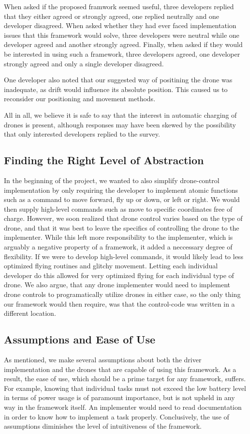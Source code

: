 When asked if the proposed framwork seemed useful, three developers replied that they either agreed or strongly agreed, one replied neutrally and one developer disagreed. When asked whether they had ever faced implementation issues that this framework would solve, three developers were neutral while one developer agreed and another strongly agreed. Finally, when asked if they would be interested in using such a framework, three developers agreed, one developer strongly agreed and only a single developer disagreed.

One developer also noted that our suggested way of positining the drone was inadequate, as drift would influence its absolute position. This caused us to reconsider our positioning and movement methods.

All in all, we believe it is safe to say that the interest in automatic charging of drones is present, although  responses may have been skewed by the possibility that only interested developers replied to the survey.

\subsection{Finding the Right Level of Abstraction}
In the beginning of the project, we wanted to also simplify drone-control implementation by only requiring the developer to implement atomic functions such as a command to move forward, fly up or down, or left or right. We would then supply high-level commands such as move to specific coordinates free of charge. However, we soon realized that drone control varies based on the type of drone, and that it was best to leave the specifics of controlling the drone to the implementer. While this left more responsibility to the implementer, which is arguably a negative property of a framework, it added a neccessary degree of flexibility. If we were to develop high-level commands, it would likely lead to less optimized flying routines and glitchy movement. Letting each individual developer do this allowed for very optimized flying for each individual type of drone. We also argue, that any drone implementer would need to implement drone controls to programatically utilize drones in either case, so the only thing our framework would then require, was that the control-code was written in a different location.

\subsection{Assumptions and Ease of Use}
As mentioned, we make several assumptions about both the driver implementation and the drones that are capable of using this framework. As a result, the ease of use, which should be a prime target for any framework, suffers. For example, knowing that individual tasks must not exceed the low battery level in terms of power usage is of paramount importance, but is not upheld in any way in the framework itself. An implementer would need to read documentation in order to know how to implement a task properly. Conclusively, the use of assumptions diminishes the level of intuitiveness of the framework.

